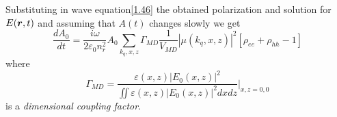 Substituting in wave equation\eqref{1.46} the obtained polarization and solution for $E(\mbox{\boldmath $r$}, t)$ and assuming that $A(t)$ changes slowly we get
\begin{equation}
	\frac{d A_0}{d t} = \frac{i \omega}{2 \varepsilon_0 n_r^2} A_0 \sum_{k_q, x, z}\Gamma_{MD} \frac{1}{V_{MD}} |\mu(k_q, x, z)|^2[\rho_{ee} + \rho_{hh} - 1]
\end{equation}
where 
\begin{equation*}
	\Gamma_{MD} = \frac{\varepsilon(x,z) |E_0(x,z)|^2}{\iint \varepsilon(x,z) |E_0(x,z)|^2 dx d z}\bigg|_{x,z=0,0}
\end{equation*}
is a \textit{dimensional coupling factor}.